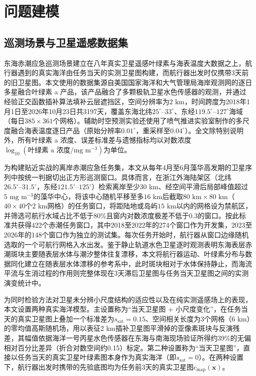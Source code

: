 \section{问题建模}

\subsection{巡测场景与卫星遥感数据集}

东海赤潮应急巡测场景建立在八年真实卫星遥感叶绿素与海表温度大数据之上，航行器遇到的真实海洋由任务当天的实测卫星图构建，而航行器出发时仅携带3天前的旧卫星图。本文使用的数据集源自美国国家海洋和大气管理局海岸观测网的逐日多星融合叶绿素 a 产品，该产品融合了多颗极轨卫星水色传感器的观测，并通过经验正交函数插补算法填补云层遮挡区\cite{beckers2003dineof}，空间分辨率为$2\text{ km}$，时间跨度为2018年1月1日至2026年10月23日共3197天，覆盖东海北纬$25^\circ\text{--}33^\circ$、东经$119.5^\circ\text{--}127^\circ$海域（每日$385\times 361$个网格）。辅助时空预测实验还使用了喷气推进实验室制作的多尺度融合海表温度逐日产品（原始分辨率$0.01^\circ$，重采样至$0.04^\circ$）\cite{chin2017mur}。全文除特别说明外，所有叶绿素 a 浓度、误差标准差与遗憾指标均以对数浓度$\log_{10}(\text{叶绿素 a 浓度}/\text{mg m}^{-3})$为单位。

为构建贴近实战的离岸赤潮应急任务集，本文从每年4月至6月藻华高发期的卫星序列中按统一判据切出正方形巡测窗口。具体而言，在浙江外海陆架区（北纬$26.5^\circ\text{--}31.5^\circ$，东经$121.5^\circ\text{--}125^\circ$）检索离岸至少$30\text{ km}$、经空间平滑后局部峰值超过$5\text{ mg m}^{-3}$的藻华中心，将该中心随机平移至多$16\text{ km}$后截取$80\text{ km}\times 80\text{ km}$（$40\times 40$个$2\text{ km}$网格）的任务窗口，将距陆地或岛屿$15\text{ km}$以内的网格设为禁航区，并筛选可航行水域占比不低于80\%且窗内对数浓度极差不低于0.3的窗口。按此标准共获得422个赤潮任务窗口，其中2018至2022年的274个窗口作为开发集，2023至2026年的148个窗口作为独立的测试集。每次任务开始时，航行器从窗口边缘随机选取的一个可航行网格入水出发。鉴于静止轨道水色卫星逐时观测表明东海表层赤潮斑块主要随表层水体与潮汐整体往复漂移\cite{lou2014diurnal}，本文将航行器运动、叶绿素分布与数据同化建立在随表层水体漂移的参考系中，此时斑块相对于水体保持静止，而海流平流与生消过程的作用则完整体现在3天滞后卫星图与任务当天卫星图之间的实测演变统计中。

为同时检验方法对卫星未分辨小尺度结构的适应性以及在纯实测遥感场上的表现，本文设置两种真实海洋模型。主设置称为“当天卫星图 + 小尺度变化”，在任务当天的真实卫星图上叠加一个标准差为$s_{\text{sat}}=0.15$、空间相关长度为3个网格（$6\text{ km}$）的零均值高斯随机场，用以表征2 km插补卫星图平滑掉的亚像素斑块与反演残差，其幅值依据海洋一号丙星水色传感器在东海与南海现场验证所得约39\%的无偏相对百分比差异（折合对数空间约0.15）标定\cite{ye2021cocts}。第二种设置称为“当天卫星图”，直接以任务当天的真实卫星叶绿素图本身作为真实海洋（即$s_{\text{sat}}=0$）。在两种设置下，航行器出发时携带的先验底图均为任务前3天的真实卫星图$c_{\text{map}}(\mathbf{x})$。

